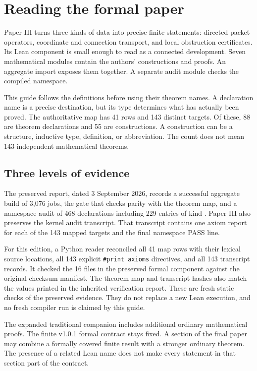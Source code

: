 \section{Reading the formal paper}
Paper III turns three kinds of data into precise finite statements: directed packet operators, coordinate and connection transport, and local obstruction certificates. Its Lean component is small enough to read as a connected development. Seven mathematical modules contain the authors' constructions and proofs. An aggregate import exposes them together. A separate audit module checks the compiled namespace.

This guide follows the definitions before using their theorem names. A declaration name is a precise destination, but its type determines what has actually been proved. The authoritative map has 41 rows and 143 distinct targets. Of these, 88 are theorem declarations and 55 are constructions. A construction can be a structure, inductive type, definition, or abbreviation. The count does not mean 143 independent mathematical theorems.

\subsection{Three levels of evidence}
The preserved report, dated 3 September 2026, records a successful aggregate build of 3,076 jobs, the gate that checks parity with the theorem map, and a namespace audit of 468 declarations including 229 entries of kind . Paper III also preserves the kernel audit transcript. That transcript contains one axiom report for each of the 143 mapped targets and the final namespace PASS line.

For this edition, a Python reader reconciled all 41 map rows with their lexical source locations, all 143 explicit \texttt{\#print axioms} directives, and all 143 transcript records. It checked the 16 files in the preserved formal component against the original checksum manifest. The theorem map and transcript hashes also match the values printed in the inherited verification report. These are fresh static checks of the preserved evidence. They do not replace a new Lean execution, and no fresh compiler run is claimed by this guide.

The expanded traditional companion includes additional ordinary mathematical proofs. The finite v1.0.1 formal contract stays fixed. A section of the final paper may combine a formally covered finite result with a stronger ordinary theorem. The presence of a related Lean name does not make every statement in that section part of the contract.

